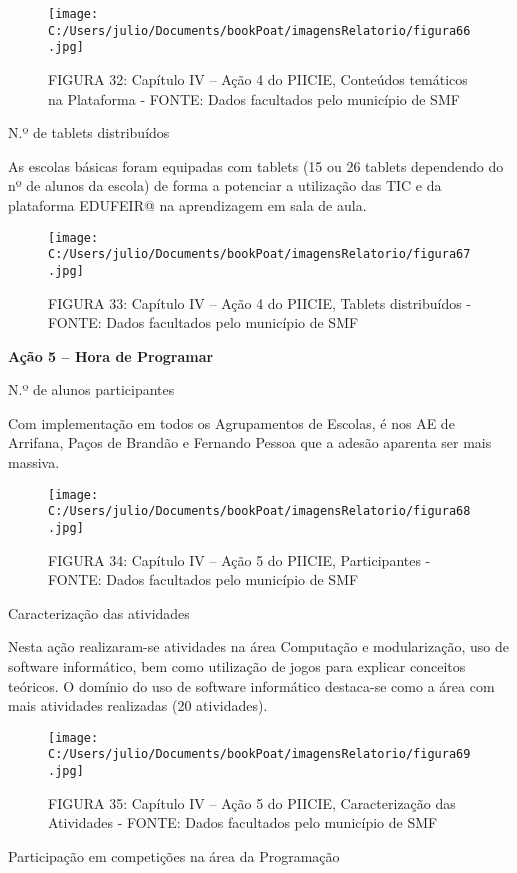\documentclass[
]{book}
\begin{document}
\begin{figure}
\centering
\texttt{[image: C:/Users/julio/Documents/bookPoat/imagensRelatorio/figura66.jpg]}
\caption{FIGURA 32: Capítulo IV -- Ação 4 do PIICIE, Conteúdos temáticos na Plataforma - FONTE: Dados facultados pelo município de SMF}
\end{figure}

N.º de tablets distribuídos

As escolas básicas foram equipadas com tablets (15 ou 26 tablets dependendo do nº de alunos da escola) de forma a potenciar a utilização das TIC e da plataforma EDUFEIR@ na aprendizagem em sala de aula.

\begin{figure}
\centering
\texttt{[image: C:/Users/julio/Documents/bookPoat/imagensRelatorio/figura67.jpg]}
\caption{FIGURA 33: Capítulo IV -- Ação 4 do PIICIE, Tablets distribuídos - FONTE: Dados facultados pelo município de SMF}
\end{figure}

\textbf{Ação 5 -- Hora de Programar}

N.º de alunos participantes

Com implementação em todos os Agrupamentos de Escolas, é nos AE de Arrifana, Paços de Brandão e Fernando Pessoa que a adesão aparenta ser mais massiva.

\begin{figure}
\centering
\texttt{[image: C:/Users/julio/Documents/bookPoat/imagensRelatorio/figura68.jpg]}
\caption{FIGURA 34: Capítulo IV -- Ação 5 do PIICIE, Participantes - FONTE: Dados facultados pelo município de SMF}
\end{figure}

Caracterização das atividades

Nesta ação realizaram-se atividades na área Computação e modularização, uso de software informático, bem como utilização de jogos para explicar conceitos teóricos. O domínio do uso de software informático destaca-se como a área com mais atividades realizadas (20 atividades).

\begin{figure}
\centering
\texttt{[image: C:/Users/julio/Documents/bookPoat/imagensRelatorio/figura69.jpg]}
\caption{FIGURA 35: Capítulo IV -- Ação 5 do PIICIE, Caracterização das Atividades - FONTE: Dados facultados pelo município de SMF}
\end{figure}

Participação em competições na área da Programação
\end{document}
